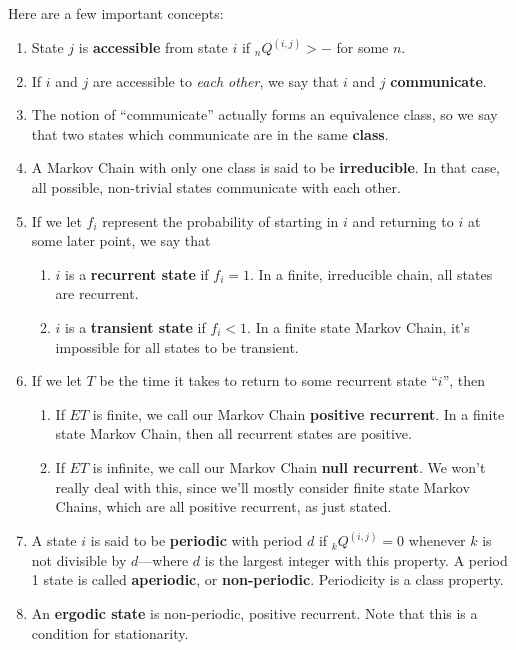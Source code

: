 \documentclass[a4paper,12pt]{scrartcl}
\begin{document}
Here are a few important concepts:
\begin{enumerate}
   \item{State $j$ is \textbf{accessible} from state $i$ if 
      ${}_nQ^{(i,j)}>-$ for some $n$.}
   \item{If $i$ and $j$ are accessible to \emph{each other}, we say that
      $i$ and $j$ \textbf{communicate}.}
   \item{The notion of ``communicate'' actually forms an equivalence
      class, so we say that two states which communicate are in the 
      same \textbf{class}.}
   \item{A Markov Chain with only one class is said to be 
      \textbf{irreducible}. In that case, all possible, non-trivial 
      states communicate with each other.}
   \item{If we let $f_i$ represent the probability of starting in
      $i$ and returning to $i$ at some later point, we say that
      \begin{enumerate}
	 \item{$i$ is a \textbf{recurrent state} if $f_i = 1$. In 
	    a finite, irreducible chain, all states are recurrent.}
	 \item{$i$ is a \textbf{transient state} if $f_i < 1$. In 
	    a finite state Markov Chain, it's impossible for all
	    states to be transient.}
      \end{enumerate}
      }
   \item{If we let $T$ be the time it takes to return to some recurrent 
      state ``$i$'', then 
      \begin{enumerate}
	 \item{If $ET$ is finite, we call our Markov Chain 
	    \textbf{positive
	    recurrent}. In a finite state Markov Chain, then all 
	    recurrent states are positive.}
	 \item{If $ET$ is infinite, we call our Markov Chain \textbf{null
	    recurrent}. We won't really deal with this, since we'll 
	    mostly consider finite state Markov Chains, which are 
	    all positive recurrent, as just stated.}
      \end{enumerate}
      }
   \item{A state $i$ is said to be \textbf{periodic} with period $d$ if
      ${}_kQ^{(i,j)}=0$ whenever $k$ is not divisible by $d$---where
      $d$ is the largest integer with this property. A period 1
      state is called \textbf{aperiodic}, or \textbf{non-periodic}. 
      Periodicity is a class property.}
   \item{An \textbf{ergodic state} is non-periodic, positive recurrent.
      Note that this is a condition for stationarity.}

\end{enumerate}
\end{document}
